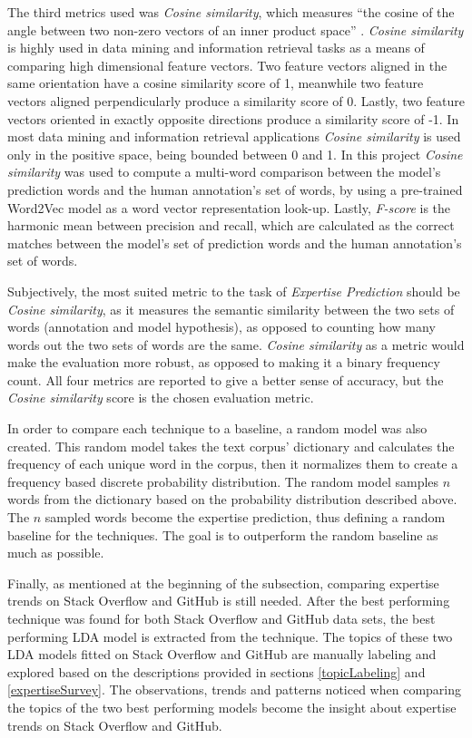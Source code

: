        The third metrics used was \emph{Cosine similarity}, which measures ``the cosine of the angle between two non-zero vectors of an inner product space'' \cite{cosSim_def}. \emph{Cosine similarity} is highly used in data mining and information retrieval tasks as a means of comparing high dimensional feature vectors. Two feature vectors aligned in the same orientation have a cosine similarity score of 1, meanwhile two feature vectors aligned perpendicularly produce a similarity score of 0. Lastly, two feature vectors oriented in exactly opposite directions produce a similarity score of -1. In most data mining and information retrieval applications \emph{Cosine similarity} is used only in the positive space, being bounded between 0 and 1. In this project \emph{Cosine similarity} was used to compute a multi-word comparison between the model's prediction words and the human annotation's set of words, by using a pre-trained Word2Vec model\cite{efstathiou2018word} as a word vector representation look-up. Lastly, \emph{F-score} is the harmonic mean between precision and recall, which are calculated as the correct matches between the model's set of prediction words and the human annotation's set of words.
       
       Subjectively, the most suited metric to the task of \emph{Expertise Prediction} should be \emph{Cosine similarity}, as it measures the semantic similarity between the two sets of words (annotation and model hypothesis), as opposed to counting how many words out the two sets of words are the same. \emph{Cosine similarity} as a metric would make the evaluation more robust, as opposed to making it a binary frequency count. All four metrics are reported to give a better sense of accuracy, but the \emph{Cosine similarity} score is the chosen evaluation metric.
        
        In order to compare each technique to a baseline, a random model was also created. This random model takes the text corpus' dictionary and calculates the frequency of each unique word in the corpus, then it normalizes them to create a frequency based discrete probability distribution. The random model samples $n$ words from the dictionary based on the probability distribution described above. The $n$ sampled words become the expertise prediction, thus defining a random baseline for the techniques. The goal is to outperform the random baseline as much as possible.
        
        Finally, as mentioned at the beginning of the subsection, comparing expertise trends on Stack Overflow and GitHub is still needed. After the best performing technique was found for both Stack Overflow and GitHub data sets, the best performing LDA model is extracted from the technique. The topics of these two LDA models fitted on Stack Overflow and GitHub are manually labeling and explored based on the descriptions provided in sections \ref{topicLabeling} and \ref{expertiseSurvey}. The observations, trends and patterns noticed when comparing the topics of the two best performing models become the insight about expertise trends on Stack Overflow and GitHub.
     
